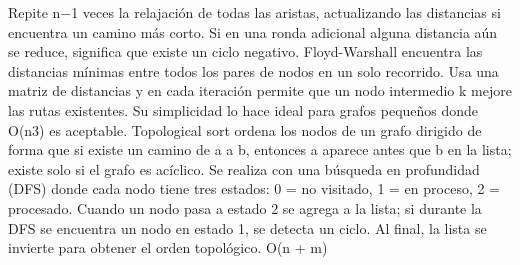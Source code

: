 {}Repite \markdownRendererDollarSign{}n−1\markdownRendererDollarSign{} veces la relajación de todas las aristas, actualizando las distancias si encuentra un camino más corto. Si en una ronda adicional alguna distancia aún se reduce, significa que existe un ciclo negativo.\markdownRendererInterblockSeparator
{}\markdownRendererInterblockSeparator
{}
\markdownRendererSectionEnd \markdownRendererSectionBegin
{}\markdownRendererInterblockSeparator
{}Floyd-Warshall encuentra las distancias mínimas entre todos los pares de nodos en un solo recorrido. Usa una matriz de distancias y en cada iteración permite que un nodo intermedio \markdownRendererDollarSign{}k\markdownRendererDollarSign{} mejore las rutas existentes. Su simplicidad lo hace ideal para grafos pequeños donde \markdownRendererDollarSign{}O(n\markdownRendererCircumflex{}3)\markdownRendererDollarSign{} es aceptable.\markdownRendererParagraphSeparator
{}\markdownRendererParagraphSeparator
{}
\markdownRendererSectionEnd \markdownRendererSectionBegin
{}\markdownRendererInterblockSeparator
{}Topological sort ordena los nodos de un grafo dirigido de forma que si existe un camino de \markdownRendererDollarSign{}a\markdownRendererDollarSign{} a \markdownRendererDollarSign{}b\markdownRendererDollarSign{}, entonces \markdownRendererDollarSign{}a\markdownRendererDollarSign{} aparece antes que \markdownRendererDollarSign{}b\markdownRendererDollarSign{} en la lista; existe solo si el grafo es acíclico.\markdownRendererHardLineBreak
{}Se realiza con una búsqueda en profundidad (DFS) donde cada nodo tiene tres estados:\markdownRendererHardLineBreak
{}\markdownRendererDollarSign{}0\markdownRendererDollarSign{} = no visitado, \markdownRendererDollarSign{}1\markdownRendererDollarSign{} = en proceso, \markdownRendererDollarSign{}2\markdownRendererDollarSign{} = procesado.\markdownRendererParagraphSeparator
{}Cuando un nodo pasa a estado \markdownRendererDollarSign{}2\markdownRendererDollarSign{} se agrega a la lista; si durante la DFS se encuentra un nodo en estado \markdownRendererDollarSign{}1\markdownRendererDollarSign{}, se detecta un ciclo.\markdownRendererHardLineBreak
{}Al final, la lista se invierte para obtener el orden topológico.  \markdownRendererDollarSign{}O(n + m)\markdownRendererDollarSign{}\markdownRendererParagraphSeparator
